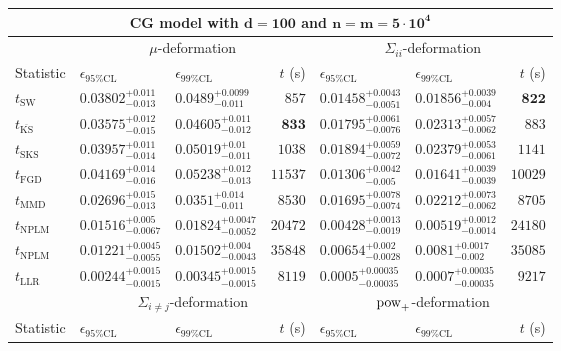 \begin{tabular}{l|llr|llr}
	\toprule
	\multicolumn{7}{c}{{\bf CG model with $\mathbf{d=100}$ and $\mathbf{n=m=5\cdot 10^{4}}$}} \\
	\toprule
	\multicolumn{1}{c}{} & \multicolumn{3}{c}{$\mu$-deformation} & \multicolumn{3}{c}{$\Sigma_{ii}$-deformation} \\
	Statistic & $\epsilon_{95\%\mathrm{CL}}$ & $\epsilon_{99\%\mathrm{CL}}$ & $t$ (s) & $\epsilon_{95\%\mathrm{CL}}$ & $\epsilon_{99\%\mathrm{CL}}$ & $t$ (s) \\
	\midrule
	$t_{\mathrm{SW}}$ & $0.03802_{-0.013}^{+0.011}$ & $0.0489_{-0.011}^{+0.0099}$ & $857$ & $0.01458_{-0.0051}^{+0.0043}$ & $0.01856_{-0.004}^{+0.0039}$ & ${\mathbf{822}}$ \\
	$t_{\overline{\mathrm{KS}}}$ & $0.03575_{-0.015}^{+0.012}$ & $0.04605_{-0.012}^{+0.011}$ & ${\mathbf{833}}$ & $0.01795_{-0.0076}^{+0.0061}$ & $0.02313_{-0.0062}^{+0.0057}$ & $883$ \\
	$t_{\mathrm{SKS}}$ & $0.03957_{-0.014}^{+0.011}$ & $0.05019_{-0.011}^{+0.01}$ & $1038$ & $0.01894_{-0.0072}^{+0.0059}$ & $0.02379_{-0.0061}^{+0.0053}$ & $1141$ \\
	$t_{\mathrm{FGD}}$ & $0.04169_{-0.016}^{+0.014}$ & $0.05238_{-0.013}^{+0.012}$ & $11537$ & ${\mathbf{0.01306_{-0.005}^{+0.0042}}}$ & ${\mathbf{0.01641_{-0.0039}^{+0.0039}}}$ & $10029$ \\
	$t_{\mathrm{MMD}}$ & ${\mathbf{0.02696_{-0.013}^{+0.015}}}$ & ${\mathbf{0.0351_{-0.011}^{+0.014}}}$ & $8530$ & $0.01695_{-0.0074}^{+0.0078}$ & $0.02212_{-0.0062}^{+0.0073}$ & $8705$ \\
\rowcolor{red!35}	$t_{\mathrm{NPLM}}$ & $0.01516_{-0.0067}^{+0.005}$ & $0.01824_{-0.0052}^{+0.0047}$ & $20472$ & $0.00428_{-0.0019}^{+0.0013}$ & $0.00519_{-0.0014}^{+0.0012}$ & $24180$ \\
\rowcolor{blue!35}	$t_{\mathrm{NPLM}}$ & $0.01221_{-0.0055}^{+0.0045}$ & $0.01502_{-0.0043}^{+0.004}$ & $35848$ & $0.00654_{-0.0028}^{+0.002}$ & $0.0081_{-0.002}^{+0.0017}$ & $35085$ \\
	$t_{\mathrm{LLR}}$ & $0.00244_{-0.0015}^{+0.0015}$ & $0.00345_{-0.0015}^{+0.0015}$ & $8119$ & $0.0005_{-0.00035}^{+0.00035}$ & $0.0007_{-0.00035}^{+0.00035}$ & $9217$ \\
	\toprule
	\multicolumn{1}{c}{} & \multicolumn{3}{c}{$\Sigma_{i\neq j}$-deformation} & \multicolumn{3}{c}{$\rm{pow}_{+}$-deformation} \\
	Statistic & $\epsilon_{95\%\mathrm{CL}}$ & $\epsilon_{99\%\mathrm{CL}}$ & $t$ (s) & $\epsilon_{95\%\mathrm{CL}}$ & $\epsilon_{99\%\mathrm{CL}}$ & $t$ (s) \\

\end{tabular}
